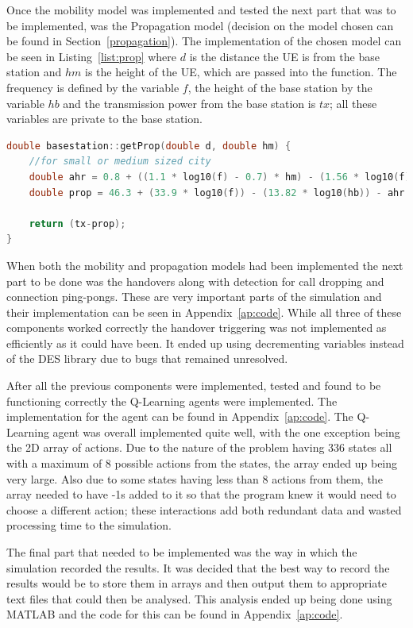 Once the mobility model was implemented and tested the next part that was to be implemented, was the Propagation model (decision on the model chosen can be found in Section~\ref{propagation}). The implementation of the chosen model can be seen in Listing~\ref{list:prop} where $d$ is the distance the UE is from the base station and $hm$ is the height of the UE, which are passed into the function. The frequency is defined by the variable $f$, the height of the base station by the variable $hb$ and the transmission power from the base station is $tx$; all these variables are private to the base station.
\begin{lstlisting}[language=c++, caption=Implementation of Cost231-Hata Propagation model., label=list:prop]
double basestation::getProp(double d, double hm) {
	//for small or medium sized city
	double ahr = 0.8 + ((1.1 * log10(f) - 0.7) * hm) - (1.56 * log10(f));
	double prop = 46.3 + (33.9 * log10(f)) - (13.82 * log10(hb)) - ahr + ((44.9 - (6.55 * log10(hb))) * log10(d/1000)); //divide by 1000 for km

	return (tx-prop);
}
\end{lstlisting}
When both the mobility and propagation models had been implemented the next part to be done was the handovers along with detection for call dropping and connection ping-pongs. These are very important parts of the simulation and their implementation can be seen in Appendix~\ref{ap:code}. While all three of these components worked correctly the handover triggering was not implemented as efficiently as it could have been. It ended up using decrementing variables instead of the DES library due to bugs that remained unresolved.

After all the previous components were implemented, tested and found to be functioning correctly the Q-Learning agents were implemented. The implementation for the agent can be found in Appendix~\ref{ap:code}. The Q-Learning agent was overall implemented quite well, with the one exception being the 2D array of actions. Due to the nature of the problem having 336 states all with a maximum of 8 possible actions from the states, the array ended up being very large. Also due to some states having less than 8 actions from them, the array needed to have -1s added to it so that the program knew it would need to choose a different action; these interactions add both redundant data and wasted processing time to the simulation. 

The final part that needed to be implemented was the way in which the simulation recorded the results. It was decided that the best way to record the results would be to store them in arrays and then output them to appropriate text files that could then be analysed. This analysis ended up being done using MATLAB and the code for this can be found in Appendix~\ref{ap:code}. 

